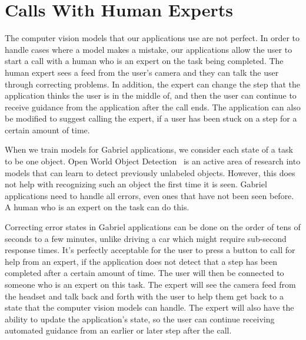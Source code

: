 \section{Calls With Human Experts}

The computer vision models that our applications use are not perfect. In order
to handle cases where a model makes a mistake, our applications allow the user
to start a call with a human who is an expert on the task being completed. The
human expert sees a feed from the user's camera and they can talk the user
through correcting problems. In addition, the expert can change the step that
the application thinks the user is in the middle of, and then the user can
continue to receive guidance from the application after the call ends.
The application can also be modified to suggest calling the expert, if a user
has been stuck on a step for a certain amount of time.

When we train models for Gabriel applications, we consider each state of a task
to be one object. Open World Object Detection~\cite{joseph2021open} is an active
area of research into models that can learn to detect previously unlabeled
objects. However, this does not help with recognizing such an object the first
time it is seen. Gabriel applications need to handle all errors, even ones that
have not been seen before. A human who is an expert on the task can do this.

Correcting error states in Gabriel applications can be done on the order of tens
of seconds to a few
minutes, unlike driving a car which might require sub-second response times.
It's perfectly acceptable for the user to press a button to call for help from
an expert, if the application does not detect that a step has been completed
after a certain amount of time. The user will then be connected to someone who
is an expert on this task. The expert will
see the camera feed from the headset and talk back and forth with the user to
help them get back to a state that the computer vision models can handle.
The expert will also have the ability to update the application's state, so the
user can continue receiving automated guidance from an earlier or later
step after the call.

